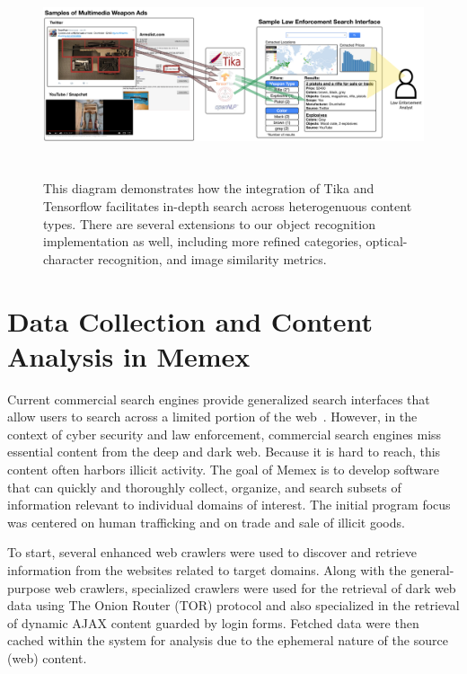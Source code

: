 \begin{figure}
	\includegraphics[width=\textwidth,height=6cm,valign=t]{interface-diagram}
	\caption{This diagram demonstrates how the integration of Tika and Tensorflow facilitates in-depth search across heterogenuous content types. There are several extensions to our object recognition implementation as well, including more refined categories, optical-character recognition, and image similarity metrics.}
	\label{fig:interface-diagram}
\end{figure}
\section{Data Collection and Content Analysis in Memex}
\label{sec:memex-data}
Current commercial search engines provide generalized search interfaces that allow users to search across a limited portion of the web~\cite{fbo-memex}. However, in the context of cyber security and law enforcement, commercial search engines miss essential content from the deep and dark web. Because it is hard to reach, this content often harbors illicit activity. The goal of Memex is to develop software that can quickly and thoroughly collect, organize, and search subsets of information relevant to individual domains of interest. The initial program focus was centered on human trafficking and on trade and sale of illicit goods.

To start, several enhanced web crawlers were used to discover and retrieve information from the websites related to target domains. Along with the general-purpose web crawlers, specialized crawlers were used for the retrieval of dark web data using The Onion Router (TOR) protocol \cite{mentor2016onion} and also specialized in the retrieval of dynamic AJAX content guarded by login forms. Fetched data were then cached within the system for analysis due to the ephemeral nature of the source (web) content.


